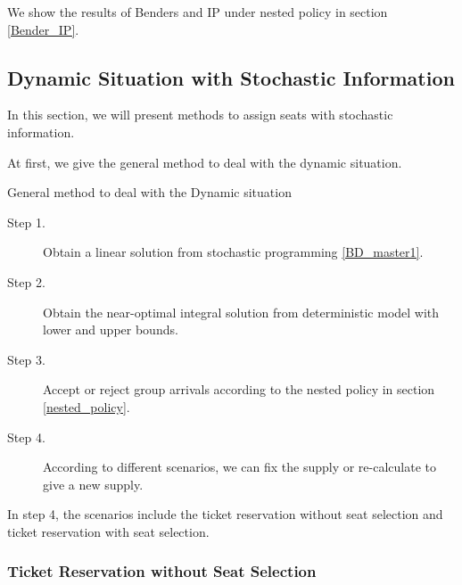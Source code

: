 

We show the results of Benders and IP under nested policy in section \ref{Bender_IP}.

\subsection{Dynamic Situation with Stochastic Information}
In this section, we will present methods to assign seats with stochastic information.

At first, we give the general method to deal with the dynamic situation.

\begin{algorithm}[H]\label{general_method}
  \caption{General method to deal with the Dynamic situation}
  \begin{description}
    \item[Step 1.] Obtain a linear solution from stochastic programming \eqref{BD_master1}.
    \item[Step 2.] Obtain the near-optimal integral solution from deterministic model with lower and upper bounds.
    \item[Step 3.] Accept or reject group arrivals according to the nested policy in section \ref{nested_policy}.
    \item[Step 4.] According to different scenarios, we can fix the supply or re-calculate to give a new supply. 
  \end{description}
\end{algorithm}

In step 4, the scenarios include the ticket reservation without seat selection and ticket reservation with seat selection. 

\subsubsection{Ticket Reservation without Seat Selection}

